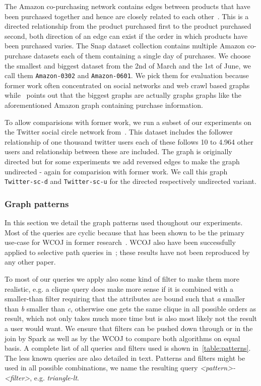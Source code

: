 The Amazon co-purchasing network contains edges between products that have been purchased together and hence are closely related to each other~\cite{snapnets}.
This is a directed relationship from the product purchased first to the product purchased second, both direction of an edge can exist if the order in which
products have been purchased varies.
The Snap dataset collection contains multiple Amazon co-purchase datasets each of them containing a single day of purchases.
We choose the smallest and biggest dataset from the 2nd of March and the 1st of June, we call them \texttt{Amazon-0302} and \texttt{Amazon-0601}.
We pick them for evaluation because former work often concentrated on social networks and web crawl based graphs~\cite{myria-detailed,ammar2018distributed}
while~\cite{salihoglu2018} points out that the biggest graphs are actually graphs graphs like the aforementioned Amazon graph containing purchase information.

To allow comparisions with former work, we run a subset of our experiments on the Twitter social circle network from~\cite{snapnets}.
This dataset includes the follower relationship of one thousand twitter users each of these follows 10 to 4.964 other users and relationship between these are included.
The graph is originally directed but for some experiments we add reversed edges to make the graph undirected - again for comparision with former work.
We call this graph \texttt{Twitter-sc-d} and \texttt{Twitter-sc-u} for the directed respectively undirected variant.

\subsubsection{Graph patterns}

In this section we detail the graph patterns used thoughout our experiments.
Most of the queries are cyclic because that has been shown to be the primary use-case for WCOJ in former research~\cite{olddog,myria-detailed}.
WCOJ also have been successfully applied to selective path queries in~\cite{olddog}; these results have not been reproduced by any other paper.

To most of our queries we apply also some kind of filter to make them more realistic, e.g. a clique query does make more sense if it is combined with a
smaller-than filter requiring that the attributes are bound such that \textit{a} smaller than \textit{b} smaller than \textit{c}, otherwise
one gets the same clique in all possible orders as result, which not only takes much more time but is also most likely not the result a user would want.
We ensure that filters can be pushed down through or in the join by Spark as well as by the WCOJ to compare both algorithms on equal basis.
A complete list of all queries and filters used is shown in~\cref{table:patterns}.
The less known queries are also detailed in text.
Patterns and filters might be used in all possible combinations, we name the resulting query \textit{\textless pattern\textgreater-\textless filter\textgreater}, e.g. \textit{triangle-lt}.

